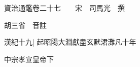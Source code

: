 






























































資治通鑑卷二十七　　宋　司馬光　撰

胡三省　音註

漢紀十九|{
	起昭陽大淵獻盡玄黓涒灘凡十年}


中宗孝宣皇帝下

